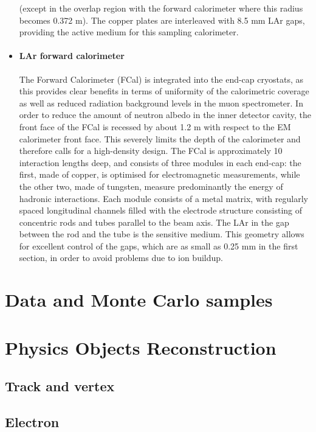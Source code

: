 \documentclass[letterpaper,12pt]{article}
\begin{document}
\begin{itemize}
		(except in the overlap region with the
		forward calorimeter where this radius becomes 0.372 m). 
		The copper plates are interleaved with
		8.5 mm LAr gaps, providing the active medium for this sampling calorimeter.
		\item \paragraph{LAr forward calorimeter}
		The Forward Calorimeter (FCal) is integrated into the end-cap cryostats, 
		as this provides clear benefits in terms of uniformity of the calorimetric 
		coverage as well as reduced radiation background levels in the muon spectrometer. 
		In order to reduce the amount of neutron albedo in the inner detector cavity, 
		the front face of the FCal is recessed by about 1.2 m with respect to the EM calorimeter 
		front face. This severely limits the depth of the calorimeter
		and therefore calls for a high-density design. The FCal is approximately 
		10 interaction lengths deep, and consists of three modules in each end-cap: 
		the first, made of copper, is optimised for	electromagnetic measurements, 
		while the other two, made of tungsten, measure predominantly the
		energy of hadronic interactions. Each module consists of a metal matrix, 
		with regularly spaced longitudinal channels filled with the electrode structure 
		consisting of concentric rods and tubes	parallel to the beam axis. 
		The LAr in the gap between the rod and the tube is the sensitive medium.
		This geometry allows for excellent control of the gaps, which are as small 
		as 0.25 mm in the first
		section, in order to avoid problems due to ion buildup. 

	\end{itemize}



	
\section{Data and Monte Carlo samples}
\section{Physics Objects Reconstruction}
\subsection{Track and vertex}
\subsection{Electron}
\end{document}

